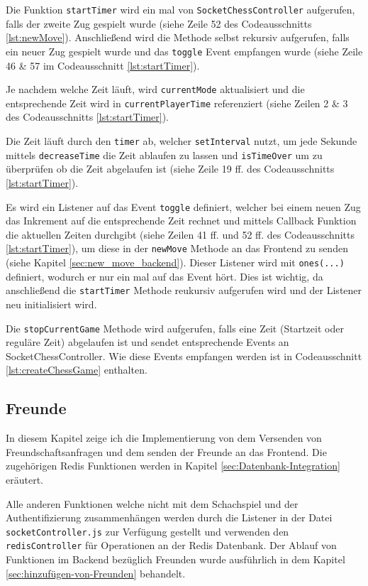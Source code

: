 Die Funktion \verb|startTimer| wird ein mal von \verb|SocketChessController| aufgerufen, falls der zweite Zug gespielt wurde (siehe Zeile 52 des Codeausschnitts \ref{lst:newMove}). Anschließend wird die Methode selbst rekursiv aufgerufen, falls ein neuer Zug gespielt wurde und das \verb|toggle| Event empfangen wurde (siehe Zeile 46 \& 57 im Codeausschnitt \ref{lst:startTimer}).

Je nachdem welche Zeit läuft, wird \verb|currentMode| aktualisiert und die entsprechende Zeit wird in \verb|currentPlayerTime| referenziert (siehe Zeilen 2 \& 3 des Codeausschnitts \ref{lst:startTimer}).

Die Zeit läuft durch den \verb|timer| ab, welcher \verb|setInterval| nutzt, um jede Sekunde mittels \verb|decreaseTime| die Zeit ablaufen zu lassen und \verb|isTimeOver| um zu überprüfen ob die Zeit abgelaufen ist (siehe Zeile 19 ff. des Codeausschnitts \ref{lst:startTimer}).

Es wird ein Listener auf das Event \verb|toggle| definiert, welcher bei einem neuen Zug das Inkrement auf die entsprechende Zeit rechnet und mittels Callback Funktion die aktuellen Zeiten durchgibt (siehe Zeilen 41 ff. und 52 ff. des Codeausschnitts \ref{lst:startTimer}), um diese in der \verb|newMove| Methode an das Frontend zu senden (siehe Kapitel \ref{sec:new_move_backend}). Dieser Listener wird mit \verb|ones(...)| definiert, wodurch er nur ein mal auf das Event hört. Dies ist wichtig, da anschließend die \verb|startTimer| Methode reukursiv aufgerufen wird und der Listener neu initialisiert wird.

Die \verb|stopCurrentGame| Methode wird aufgerufen, falls eine Zeit (Startzeit oder reguläre Zeit) abgelaufen ist und sendet entsprechende Events an SocketChessController. Wie diese Events empfangen werden ist in Codeausschnitt \ref{lst:createChessGame} enthalten.


\subsection{Freunde}
\label{sec:Freunde-impl}
In diesem Kapitel zeige ich die Implementierung von dem Versenden von Freundschaftsanfragen und dem senden der Freunde an das Frontend. Die zugehörigen Redis Funktionen werden in Kapitel \ref{sec:Datenbank-Integration} eräutert.

Alle anderen Funktionen welche nicht mit dem Schachspiel und der Authentifizierung zusammenhängen werden durch die Listener in der Datei \verb|socketController.js| zur Verfügung gestellt und verwenden den \verb|redisController| für Operationen an der Redis Datenbank. Der Ablauf von Funktionen im Backend bezüglich Freunden wurde ausführlich in dem Kapitel \ref{sec:hinzufügen-von-Freunden} behandelt.

